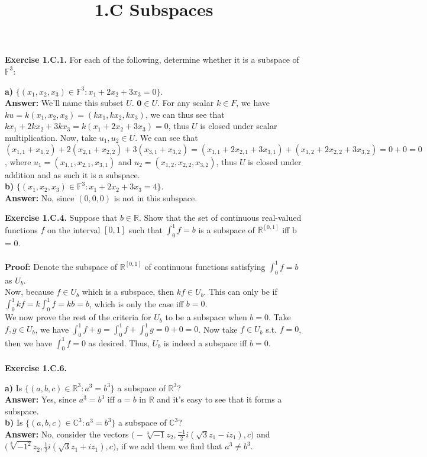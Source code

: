 \documentclass{article}
\title{\textbf{1.C Subspaces}}
\begin{document}
	\maketitle
	\textbf{Exercise 1.C.1.} For each of the following, determine whether it is a subspace of $\mathbb{F}^3$:
	\begin{itemize}
		\textbf{a)} $\{(x_1, x_2, x_3) \in \mathbb{F}^3 : x_1 + 2x_2 + 3x_3 = 0\}$. \\
		\textbf{Answer:} We'll name this subset $U$. $\mathbf{0} \in U$. For any scalar $k \in F$, we have $ku = k(x_1, x_2, x_3) = (kx_1, kx_2, kx_3)$, we can thus see that $kx_1 + 2kx_2 + 3kx_3 = k(x_1 + 2x_2 + 3x_3) = 0$, thus $U$ is closed under scalar multiplication. Now, take $u_1, u_2 \in U$. We can see that $(x_{1, 1} + x_{1, 2}) + 2(x_{2, 1} + x_{2, 2}) + 3(x_{3, 1} + x_{3, 2}) = (x_{1, 1} + 2x_{2, 1} + 3x_{3, 1}) + (x_{1, 2} + 2x_{2, 2} + 3x_{3, 2}) = 0 + 0 = 0$, where $u_1 = (x_{1, 1}, x_{2, 1}, x_{3, 1})$ and $u_2 = (x_{1, 2}, x_{2, 2}, x_{3, 2})$, thus $U$ is closed under addition and as such it is a subspace. \\
		\textbf{b)} $\{(x_1, x_2, x_3) \in \mathbb{F}^3 : x_1 + 2x_2 + 3x_3 = 4\}$. \\
		\textbf{Answer:} No, since $(0, 0, 0)$ is not in this subspace.
	\end{itemize}
	\textbf{Exercise 1.C.4.} Suppose that $b \in \mathbb{R}$. Show that the set of continuous real-valued functions $f$ on the interval $[0, 1]$ such that $\int_0^1 f = b$ is a subspace of $\mathbb{R}^{[0, 1]}$ iff b = 0. \\ \\
	\textbf{Proof:} Denote the subspace of $\mathbb{R}^{[0, 1]}$ of continuous functions satisfying $\int_0^1 f = b$ as $U_b$.\\
	Now, because $f \in U_b$ which is a subspace, then $kf \in U_b$. This can only be if $\int_0^1 kf = k\int_0^1 f = kb = b$, which is only the case iff $b = 0$. \\
	We now prove the rest of the criteria for $U_b$ to be a subspace when $b = 0$. Take $f, g \in U_b$, we have $\int_0^1 f + g = \int_0^1 f + \int_0^1 g = 0 + 0 = 0$. Now take $f \in U_b$ s.t. $f = 0$, then we have $\int_0^1 f = 0$ as desired. Thus, $U_b$ is indeed a subspace iff $b = 0$. \\ \\
	\textbf{Exercise 1.C.6.} \begin{itemize}
		\textbf{a)} Is $\{(a, b, c) \in \mathbb{R}^3 : a^3 = b^3\}$ a subspace of $\mathbb{R}^3$? \\
		\textbf{Answer:} Yes, since $a^3 = b^3$ iff $a = b$ in $\mathbb{R}$ and it's easy to see that it forms a subspace. \\
		\textbf{b)} Is $\{(a, b, c) \in \mathbb{C}^3 : a^3 = b^3\}$ a subspace of $\mathbb{C}^3$? \\
		\textbf{Answer:} No, consider the vectors $\big(-\sqrt[3]{-1}z_2, \frac{-1}{2}i(\sqrt{3}z_1 - iz_1), c\big)$ and $\big(\sqrt[3]{-1^2}z_2, \frac{1}{2}i(\sqrt{3}z_1 + iz_1), c\big)$, if we add them we find that $a^3 \neq b^3$.
	\end{itemize}
\end{document}
